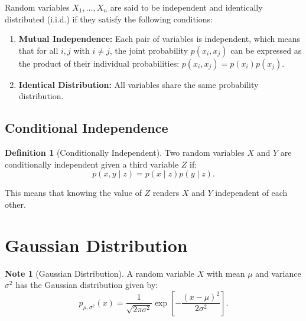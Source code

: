 \documentclass[12pt,openany]{book}
\theoremstyle{definition}
\newtheorem{definition}{Definition}[chapter]
\newtheorem*{note}{Note}
\begin{document}
	Random variables \( X_1, \dots, X_n \) are said to be independent and identically distributed (i.i.d.) if they satisfy the following conditions:
	
	\begin{enumerate}[(1)]
		\item \textbf{Mutual Independence:} Each pair of variables is independent, which means that for all \( i, j \) with \( i \neq j \), the joint probability \( p(x_i, x_j) \) can be expressed as the product of their individual probabilities: \( p(x_i, x_j) = p(x_i)p(x_j) \).
		\item \textbf{Identical Distribution:} All variables share the same probability distribution.
	\end{enumerate}
	
	\subsection{Conditional Independence}
	
	\begin{definition}[Conditionally Independent]
		Two random variables \( X \) and \( Y \) are conditionally independent given a third variable \( Z \) if:
		\[
		p(x, y \mid z) = p(x \mid z)p(y \mid z).
		\]
	\end{definition}
	
	This means that knowing the value of \( Z \) renders \( X \) and \( Y \) independent of each other.
	
	\newpage
	\section{Gaussian Distribution}
	
	\begin{note}[Gaussian Distribution]
		A random variable \( X \) with mean \( \mu \) and variance \( \sigma^2 \) has the Gaussian distribution given by:
		\[
		p_{\mu, \sigma^2}(x) = \frac{1}{\sqrt{2\pi\sigma^2}}\exp\left[-\frac{(x - \mu)^2}{2\sigma^2}\right].
		\]
	\end{note}
\end{document}
